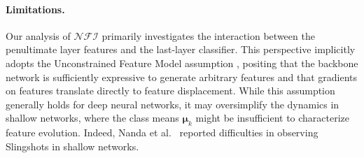 \documentclass{article}
\theoremstyle{plain}
\theoremstyle{definition}
\theoremstyle{remark}
\begin{document}
\paragraph{Limitations.} Our analysis of $\mathcal{NFI}$ primarily investigates the interaction between the penultimate layer features and the last-layer classifier. 
This perspective implicitly adopts the Unconstrained Feature Model assumption \cite{mixon2022}, 
positing that the backbone network is sufficiently expressive to generate arbitrary features 
and that gradients on features translate directly to feature displacement. 
While this assumption generally holds for deep neural networks, 
it may oversimplify the dynamics in shallow networks, 
where the class means $\bm{\mu}_k$ might be insufficient to characterize feature evolution. 
Indeed, Nanda et al.~\cite{nanda2023} reported difficulties in observing Slingshots in shallow networks.



\newpage
\end{document}
